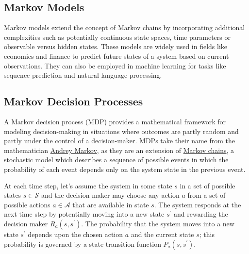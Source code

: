 \documentclass[11pt]{article}
\theoremstyle{definition}
\begin{document}
\subsection{Markov Models}
Markov models extend the concept of Markov chains by incorporating additional complexities such as potentially continuous state spaces, time parameters or observable versus hidden states. 
These models are widely used in fields like economics and finance to predict future states of a system based on current observations. 
They can also be employed in machine learning for tasks like sequence prediction and natural language processing. 

\subsection{Markov Decision Processes}
A Markov decision process (MDP) provides a mathematical framework for modeling decision-making in situations 
where outcomes are partly random and partly under the control of a decision-maker. 
MDPs take their name from the mathematician \href{https://en.wikipedia.org/wiki/Andrey_Markov}{Andrey Markov}, 
as they are an extension of \href{https://en.wikipedia.org/wiki/Markov_chain}{Markov chains}, 
a stochastic model which describes a sequence of possible events in which the probability of each event depends only on the 
system state in the previous event.

At each time step, let's assume the system in some state $s$ in a set of possible states $s\in\mathcal{S}$ and the decision maker 
may choose any action $a$ from a set of possible actions $a\in\mathcal{A}$ that are available in state $s$. 
The system responds at the next time step by potentially moving into a new state $s^{\prime}$ and rewarding the decision maker $R_{a}\left(s, s^{\prime}\right)$.
The probability that the system moves into a new state $s^{\prime}$ depends upon the chosen action $a$ and the current state $s$; 
this probability is governed by a state transition function $P_{a}\left(s,s^{\prime}\right)$.
\end{document}
